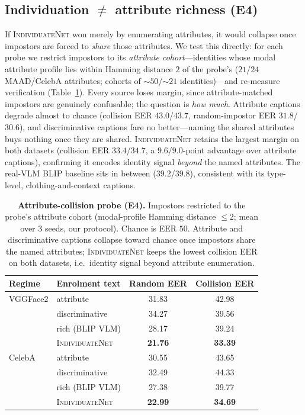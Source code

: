 \documentclass[10pt,twocolumn,letterpaper]{article}
\newcommand{\method}{\textsc{IndividuateNet}}
\begin{document}
\subsection{Individuation $\neq$ attribute richness (E4)}
\label{sec:e4}
If \method{} won merely by enumerating attributes, it would collapse once impostors are forced
to \emph{share} those attributes. We test this directly: for each probe we restrict impostors to
its \emph{attribute cohort}---identities whose modal attribute profile lies within Hamming
distance $2$ of the probe's ($21$/$24$ MAAD/CelebA attributes; cohorts of $\sim$$50$/$\sim$$21$
identities)---and re-measure verification (Table~\ref{tab:collision}). Every source loses margin,
since attribute-matched impostors are genuinely confusable; the question is \emph{how much}.
Attribute captions degrade almost to chance (collision EER $43.0$/$43.7$, random-impostor EER
$31.8$/$30.6$), and discriminative captions fare no better---naming the shared attributes buys
nothing once they are shared. \method{} retains the largest margin on both datasets (collision
EER $33.4$/$34.7$, a $9.6$/$9.0$-point advantage over attribute captions), confirming it encodes
identity signal \emph{beyond} the named attributes. The real-VLM BLIP baseline sits in
between ($39.2$/$39.8$), consistent with its type-level, clothing-and-context captions.

\begin{table}[t]
  \centering\small
  \setlength{\tabcolsep}{5pt}
  \begin{tabular}{@{}llcc@{}}
    \toprule
    \textbf{Regime} & \textbf{Enrolment text} & \textbf{Random EER} & \textbf{Collision EER} \\
    \midrule
    VGGFace2 & attribute        & 31.83 & 42.98 \\
             & discriminative   & 34.27 & 39.56 \\
             & rich (BLIP VLM)  & 28.17 & 39.24 \\
             & \method{}        & \textbf{21.76} & \textbf{33.39} \\
    \midrule
    CelebA   & attribute        & 30.55 & 43.65 \\
             & discriminative   & 32.49 & 44.33 \\
             & rich (BLIP VLM)  & 27.38 & 39.77 \\
             & \method{}        & \textbf{22.99} & \textbf{34.69} \\
    \bottomrule
  \end{tabular}
  \caption{\textbf{Attribute-collision probe (E4).} Impostors restricted to the probe's
  attribute cohort (modal-profile Hamming distance $\le 2$; mean over 3 seeds, our protocol).
  Chance is EER $50$. Attribute and discriminative captions collapse toward chance once
  impostors share the named attributes; \method{} keeps the lowest collision EER on both
  datasets, i.e.\ identity signal beyond attribute enumeration.}
  \label{tab:collision}
\end{table}
\end{document}
